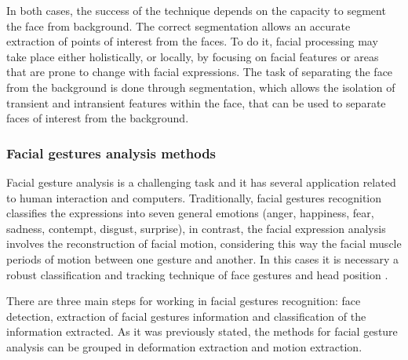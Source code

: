 In both cases, the success of the technique depends on the capacity to segment the face from background. The correct segmentation allows an accurate extraction of points of interest from the faces. To do it, facial processing may take place either holistically, or locally, by focusing on facial features or areas that are prone to change with facial expressions. The task of separating the face from the background is done through segmentation, which allows the isolation of transient and intransient features within the face, that can be used to separate faces of interest from the background.

\subsubsection{Facial gestures analysis methods}
Facial gesture analysis is a challenging task and it has several application related to human interaction and computers. Traditionally, facial gestures recognition classifies the expressions into seven general emotions (anger, happiness, fear, sadness, contempt, disgust, surprise), in contrast, the facial expression analysis involves the reconstruction of facial motion, considering this way the facial muscle periods of motion between one gesture and another. In this cases it is necessary a robust classification and tracking technique of face gestures and head position \cite{Cinar01}.

There are three main steps for working in facial gestures recognition: face detection, extraction of facial gestures information and classification of the information extracted. As it was previously stated, the methods for facial gesture analysis can be grouped in deformation extraction and motion extraction.%

